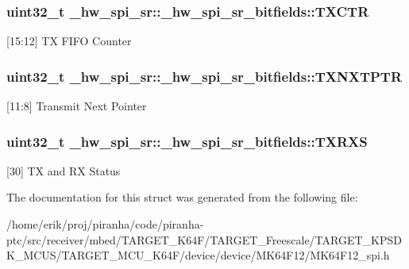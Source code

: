 \subsubsection[{\texorpdfstring{T\+X\+C\+TR}{TXCTR}}]{\setlength{\rightskip}{0pt plus 5cm}uint32\+\_\+t \+\_\+hw\+\_\+spi\+\_\+sr\+::\+\_\+hw\+\_\+spi\+\_\+sr\+\_\+bitfields\+::\+T\+X\+C\+TR}\hypertarget{struct__hw__spi__sr_1_1__hw__spi__sr__bitfields_a2a93c8f023a926e7ba5d61e9c1c359e0}{}\label{struct__hw__spi__sr_1_1__hw__spi__sr__bitfields_a2a93c8f023a926e7ba5d61e9c1c359e0}
\mbox{[}15\+:12\mbox{]} TX F\+I\+FO Counter 
\subsubsection[{\texorpdfstring{T\+X\+N\+X\+T\+P\+TR}{TXNXTPTR}}]{\setlength{\rightskip}{0pt plus 5cm}uint32\+\_\+t \+\_\+hw\+\_\+spi\+\_\+sr\+::\+\_\+hw\+\_\+spi\+\_\+sr\+\_\+bitfields\+::\+T\+X\+N\+X\+T\+P\+TR}\hypertarget{struct__hw__spi__sr_1_1__hw__spi__sr__bitfields_aca60b2cf1d3caed249663f383dac875c}{}\label{struct__hw__spi__sr_1_1__hw__spi__sr__bitfields_aca60b2cf1d3caed249663f383dac875c}
\mbox{[}11\+:8\mbox{]} Transmit Next Pointer 
\subsubsection[{\texorpdfstring{T\+X\+R\+XS}{TXRXS}}]{\setlength{\rightskip}{0pt plus 5cm}uint32\+\_\+t \+\_\+hw\+\_\+spi\+\_\+sr\+::\+\_\+hw\+\_\+spi\+\_\+sr\+\_\+bitfields\+::\+T\+X\+R\+XS}\hypertarget{struct__hw__spi__sr_1_1__hw__spi__sr__bitfields_a51c630e1e41e8c82badebafb465d2da5}{}\label{struct__hw__spi__sr_1_1__hw__spi__sr__bitfields_a51c630e1e41e8c82badebafb465d2da5}
\mbox{[}30\mbox{]} TX and RX Status 

The documentation for this struct was generated from the following file\+:\begin{DoxyCompactItemize}
\item 
/home/erik/proj/piranha/code/piranha-\/ptc/src/receiver/mbed/\+T\+A\+R\+G\+E\+T\+\_\+\+K64\+F/\+T\+A\+R\+G\+E\+T\+\_\+\+Freescale/\+T\+A\+R\+G\+E\+T\+\_\+\+K\+P\+S\+D\+K\+\_\+\+M\+C\+U\+S/\+T\+A\+R\+G\+E\+T\+\_\+\+M\+C\+U\+\_\+\+K64\+F/device/device/\+M\+K64\+F12/M\+K64\+F12\+\_\+spi.\+h\end{DoxyCompactItemize}
